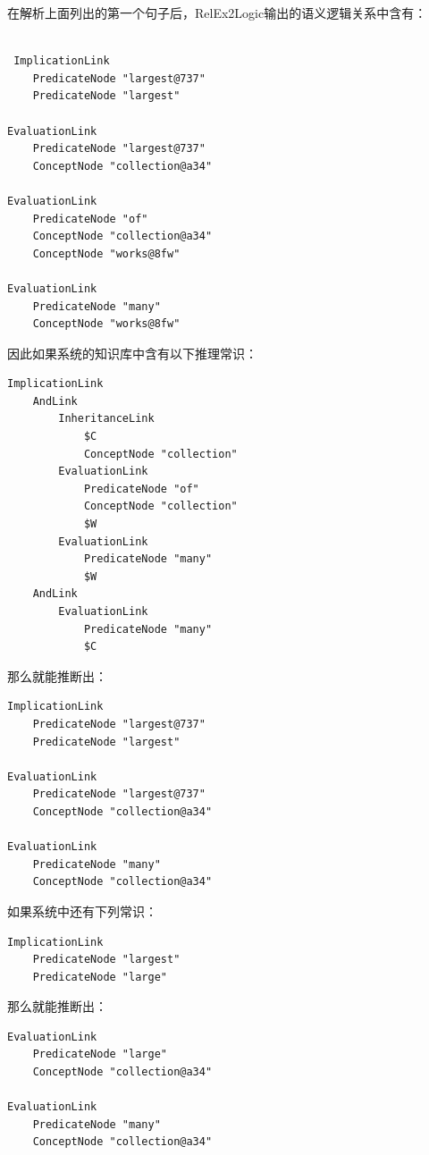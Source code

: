 在解析上面列出的第一个句子后，RelEx2Logic输出的语义逻辑关系中含有：

 {\tt\begin{small}\begin{lstlisting}

 ImplicationLink
 	PredicateNode "largest@737"
	PredicateNode "largest"

EvaluationLink
	PredicateNode "largest@737"
	ConceptNode "collection@a34"
	
EvaluationLink
	PredicateNode "of"
	ConceptNode "collection@a34"
	ConceptNode "works@8fw"
	
EvaluationLink
	PredicateNode "many"
	ConceptNode "works@8fw"
\end{lstlisting}\end{small}}

\noindent 因此如果系统的知识库中含有以下推理常识：

{\tt\begin{small}\begin{lstlisting}
ImplicationLink
	AndLink
		InheritanceLink
			$C
			ConceptNode "collection"
		EvaluationLink
			PredicateNode "of"
			ConceptNode "collection"
			$W
		EvaluationLink
			PredicateNode "many"
			$W
	AndLink
		EvaluationLink
			PredicateNode "many"
			$C
 \end{lstlisting}\end{small}}

\noindent 那么就能推断出：

 {\tt\begin{small}\begin{lstlisting}
ImplicationLink
 	PredicateNode "largest@737"
	PredicateNode "largest"

EvaluationLink
	PredicateNode "largest@737"
	ConceptNode "collection@a34"
	
EvaluationLink
	PredicateNode "many"
	ConceptNode "collection@a34"
\end{lstlisting}\end{small}}

\noindent 如果系统中还有下列常识：

 {\tt\begin{small}\begin{lstlisting}
ImplicationLink
	PredicateNode "largest"
	PredicateNode "large"
\end{lstlisting}\end{small}}

\noindent 那么就能推断出：

 {\tt\begin{small}\begin{lstlisting}
EvaluationLink
	PredicateNode "large"
	ConceptNode "collection@a34"
	
EvaluationLink
	PredicateNode "many"
	ConceptNode "collection@a34"
\end{lstlisting}\end{small}}


